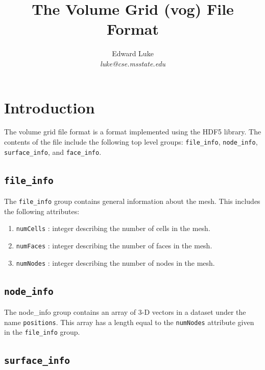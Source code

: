 \documentclass{article}
\begin{document}
\title{The Volume Grid (vog) File Format}

\author{ Edward Luke \\
\it luke@cse.msstate.edu}


\maketitle


\section{Introduction}

The volume grid file format is a format implemented using the HDF5
library.  The contents of the file include the following top level
groups: {\tt file\_info}, {\tt node\_info}, {\tt surface\_info}, and
{\tt face\_info}.

\subsection{\tt file\_info}

The {\tt file\_info} group contains general information about the mesh.  This
includes the following attributes:
\begin{enumerate}
  \item {\tt numCells} : integer describing the number of cells in the mesh.
  \item {\tt numFaces} : integer describing the number of faces in the mesh.
  \item {\tt numNodes} : integer describing the number of nodes in the mesh.
\end{enumerate}

\subsection{\tt node\_info}

The {node\_info} group contains an array of 3-D vectors in a dataset
under the name {\tt positions}.  This array has a length equal to the
{\tt numNodes} attribute given in the {\tt file\_info} group.


\subsection{\tt surface\_info}
\end{document}
